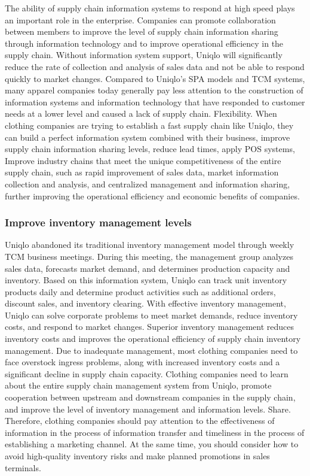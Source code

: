 \documentclass[12pt,a4paper]{article}
\begin{document}
The ability of supply chain information systems to respond at high speed
plays an important role in the enterprise. Companies can promote
collaboration between members to improve the level of supply chain
information sharing through information technology and to improve
operational efficiency in the supply chain. Without information system
support, Uniqlo will significantly reduce the rate of collection and
analysis of sales data and not be able to respond quickly to market
changes. Compared to Uniqlo's SPA models and TCM systems, many apparel
companies today generally pay less attention to the construction of
information systems and information technology that have responded to
customer needs at a lower level and caused a lack of supply chain.
Flexibility. When clothing companies are trying to establish a fast
supply chain like Uniqlo, they can build a perfect information system
combined with their business, improve supply chain information sharing
levels, reduce lead times, apply POS systems, Improve industry chains
that meet the unique competitiveness of the entire supply chain, such as
rapid improvement of sales data, market information collection and
analysis, and centralized management and information sharing, further
improving the operational efficiency and economic benefits of companies.

\hypertarget{improve-inventory-management-levels}{%
\subsubsection{Improve inventory management
levels}\label{improve-inventory-management-levels}}

Uniqlo abandoned its traditional inventory management model through
weekly TCM business meetings. During this meeting, the management group
analyzes sales data, forecasts market demand, and determines production
capacity and inventory. Based on this information system, Uniqlo can
track unit inventory products daily and determine product activities
such as additional orders, discount sales, and inventory clearing. With
effective inventory management, Uniqlo can solve corporate problems to
meet market demands, reduce inventory costs, and respond to market
changes. Superior inventory management reduces inventory costs and
improves the operational efficiency of supply chain inventory
management. Due to inadequate management, most clothing companies need
to face overstock ingress problems, along with increased inventory costs
and a significant decline in supply chain capacity. Clothing companies
need to learn about the entire supply chain management system from
Uniqlo, promote cooperation between upstream and downstream companies in
the supply chain, and improve the level of inventory management and
information levels. Share. Therefore, clothing companies should pay
attention to the effectiveness of information in the process of
information transfer and timeliness in the process of establishing a
marketing channel. At the same time, you should consider how to avoid
high-quality inventory risks and make planned promotions in sales
terminals.
\end{document}
